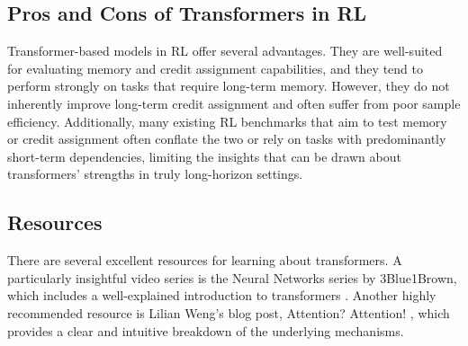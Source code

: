 \subsection{Pros and Cons of Transformers in RL}
Transformer-based models in RL offer several advantages. They are well-suited for evaluating memory and credit assignment 
capabilities, and they tend to perform strongly on tasks that require long-term memory. However, they do not inherently improve 
long-term credit assignment and often suffer from poor sample efficiency. Additionally, many existing RL benchmarks that aim to 
test memory or credit assignment often conflate the two or rely on tasks with predominantly short-term dependencies, limiting the 
insights that can be drawn about transformers' strengths in truly long-horizon settings.

\subsection{Resources}
There are several excellent resources for learning about transformers. A particularly insightful video series is the Neural 
Networks series by 3Blue1Brown, which includes a well-explained introduction to transformers \cite{3ble1brownNN}. Another highly 
recommended resource is Lilian Weng’s blog post, Attention? Attention! \cite{weng2018attention}, which provides a clear and 
intuitive breakdown of the underlying mechanisms.




%


